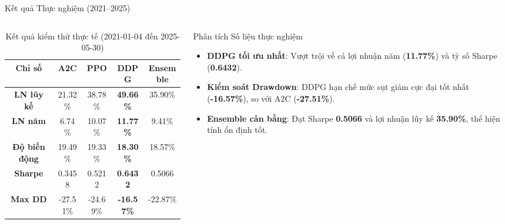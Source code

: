 \documentclass[10pt,aspectratio=169]{beamer}
\begin{document}
\begin{frame}{Kết quả Thực nghiệm (2021--2025)}
  \begin{columns}[c]
    \begin{column}{0.54\textwidth}
      \begin{table}[h]
        \centering
        \caption{Kết quả kiểm thử thực tế (2021-01-04 đến 2025-05-30)}
        \scriptsize
        \setlength{\tabcolsep}{3pt}
        \begin{tabular}{ccccc}
          \toprule
          \textbf{Chỉ số} & \textbf{A2C} & \textbf{PPO} & \textbf{DDPG} & \textbf{Ensemble} \\
          \midrule
          \textbf{LN lũy kế} & 21.32\% & 38.78\% & \textbf{49.66\%} & 35.90\% \\
          \textbf{LN năm} & 6.74\% & 10.07\% & \textbf{11.77\%} & 9.41\% \\
          \textbf{Độ biến động} & 19.49\% & 19.33\% & \textbf{18.30\%} & 18.57\% \\
          \textbf{Sharpe} & 0.3458 & 0.5212 & \textbf{0.6432} & 0.5066 \\
          \textbf{Max DD} & -27.51\% & -24.69\% & \textbf{-16.57\%} & -22.87\% \\
          \bottomrule
        \end{tabular}
      \end{table}
    \end{column}
    
    \begin{column}{0.44\textwidth}
      \begin{block}{Phân tích Số liệu thực nghiệm}
        \scriptsize
        \begin{itemize}
          \item \textbf{DDPG tối ưu nhất}: Vượt trội về cả lợi nhuận năm (\textbf{11.77\%}) và tỷ số Sharpe (\textbf{0.6432}).
          \item \textbf{Kiểm soát Drawdown}: DDPG hạn chế mức sụt giảm cực đại tốt nhất (\textbf{-16.57\%}), so với A2C (\textbf{-27.51\%}).
          \item \textbf{Ensemble cân bằng}: Đạt Sharpe \textbf{0.5066} và lợi nhuận lũy kế \textbf{35.90\%}, thể hiện tính ổn định tốt.
        \end{itemize}
      \end{block}
    \end{column}
  \end{columns}
\end{frame}
\end{document}

